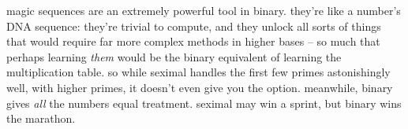 \documentclass[../best.tex]{subfiles}
\begin{document}
magic sequences are an extremely powerful tool in binary. they're like a number's DNA sequence: they're trivial to compute, and they unlock all sorts of things that would require far more complex methods in higher bases -- so much that perhaps learning \emph{them} would be the binary equivalent of learning the multiplication table. so while seximal handles the first few primes astonishingly well, with higher primes, it doesn't even give you the option. meanwhile, binary gives \emph{all} the numbers equal treatment. seximal may win a sprint, but binary wins the marathon.
\end{document}

